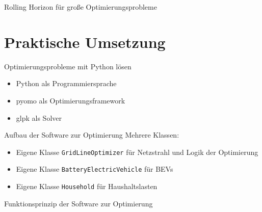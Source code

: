 \documentclass[aspectratio=169]{beamer}
\begin{document}
\begin{frame}{Rolling Horizon für große Optimierungsprobleme}
	\begin{figure}
		\centering
		
	\end{figure}
\end{frame}


\section{Praktische Umsetzung}

\begin{frame}{Optimierungsprobleme mit Python lösen}
	\begin{itemize}
		\item Python als Programmiersprache
		\item pyomo als Optimierungsframework
		\item glpk als Solver
	\end{itemize}
	
\end{frame}


\begin{frame}{Aufbau der Software zur Optimierung}
	Mehrere Klassen:
	\begin{itemize}
		\item Eigene Klasse \texttt{GridLineOptimizer} für Netzstrahl und 
		Logik der Optimierung
		\item Eigene Klasse \texttt{BatteryElectricVehicle} für BEVs
		\item Eigene Klasse \texttt{Household} für Haushaltslasten
	\end{itemize}
	
\end{frame}


\begin{frame}{Funktionsprinzip der Software zur Optimierung}
	\begin{figure}
		\centering
		
	\end{figure}
\end{frame}
\end{document}
